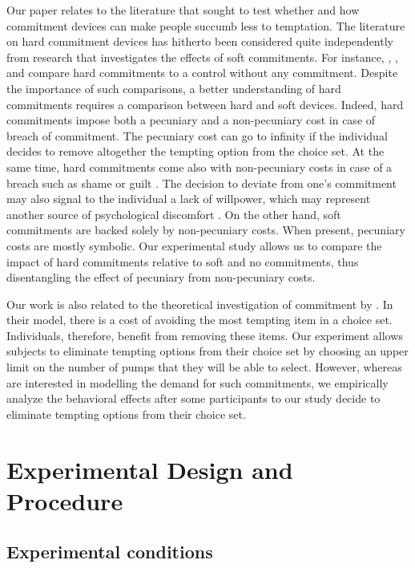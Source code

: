 \documentclass[
]{book}
\begin{document}
Our paper relates to the literature that sought to test whether and how
commitment devices can make people succumb less to temptation.
The literature on hard commitment devices has hitherto been considered quite
independently from research that investigates the effects of soft commitments.
For instance, \citet{trope2000counteractive}, \citet{ariely2002procrastination}, and
\citet{houser2018temptation} compare hard commitments to a control without any
commitment.
Despite the importance of such comparisons, a better understanding of hard
commitments requires a comparison between hard and soft devices.
Indeed, hard commitments impose both a pecuniary and a non-pecuniary cost in
case of breach of commitment.
The pecuniary cost can go to infinity if the individual decides to remove
altogether the tempting option from the choice set.
At the same time, hard commitments come also with non-pecuniary costs in case of
a breach such as shame or guilt \citep{kast2014saving}.
The decision to deviate from one's commitment may also signal to the individual
a lack of willpower, which may represent another source of psychological
discomfort \citep{benabou2004willpower}.
On the other hand, soft commitments are backed solely by non-pecuniary costs.
When present, pecuniary costs are mostly symbolic.
Our experimental study allows us to compare the impact of hard commitments
relative to soft and no commitments, thus disentangling the effect of pecuniary
from non-pecuniary costs.

Our work is also related to the theoretical investigation of commitment by
\citet{gul2001temptation}.
In their model, there is a cost of avoiding the most tempting item in a choice
set.
Individuals, therefore, benefit from removing these items.
Our experiment allows subjects to eliminate tempting options from their choice
set by choosing an upper limit on the number of pumps that they will be able to
select.
However, whereas \citet{gul2001temptation} are interested in modelling the demand for
such commitments, we empirically analyze the behavioral effects after some
participants to our study decide to eliminate tempting options from their choice
set.

\hypertarget{mm2}{%
\section{Experimental Design and Procedure}\label{mm2}}

\hypertarget{experimental-conditions}{%
\subsection{Experimental conditions}\label{experimental-conditions}}
\end{document}
